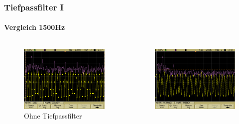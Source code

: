 \begin{frame}
    \frametitle{Tiefpassfilter I}
    \framesubtitle{Vergleich 1500Hz}
    \begin{columns}[c]
            \begin{figure}[H]
            \begin{center}
                    \includegraphics[scale=0.12]{./img/oszi/scope_23.png}
            \end{center}
            \caption{Ohne Tiefpassfilter}
            \end{figure}  
            \begin{figure}[H]
            \begin{center}
                    \includegraphics[scale=0.12]{./img/oszi/scope_32.png}

\end{center}
\end{figure}
\end{columns}
\end{frame}

